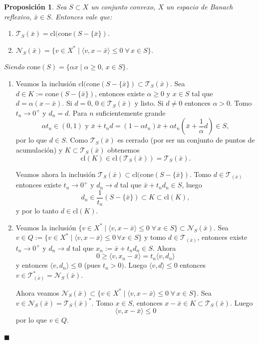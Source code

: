\documentclass[a4paper,10pt]{book}
\newcommand{\bx}{\bar{x}}
\newcommand{\cN}{\mathcal{N}}
\newcommand{\cT}{\mathcal{T}}
\newcommand{\la}{\langle}
\newcommand{\ra}{\rangle}
\newtheorem{prop}[teo]{Proposici\'on}
\newenvironment{dem}{\vspace*{-0.1cm}{\it Demostraci\'on:}}{\hfill
$\blacksquare$\\}
\begin{document}
\begin{prop}\label{conoconv}
Sea $S\subset X$ un conjunto convexo, $X$ un espacio de Banach reflexivo, $\bx\in S$. Entonces vale que:
\begin{enumerate}
\item $\cT_{S}(\bx)=\mathrm{cl}(\mathrm{cone}(S-\{\bx\})$.
\item $\cN_{S}(\bx)=\{v\in X^*\mid\langle v,x-\bx\rangle\leq 0\; \forall\,x\in S\}$.
\end{enumerate}
Siendo $\mathrm{cone}(S)=\{\alpha x\mid \alpha\geq0,\,x\in S\}$.
\end{prop} 
\begin{dem}
\begin{enumerate}
\item Veamos la inclusión $\mathrm{cl}(\mathrm{cone}(S-\{\bx\})\subset\cT_{S}(\bx)$. Sea $d\in K:=\mathrm{cone}(S-\{\bx\})$, entonces existe $\alpha\geq0$ y $x\in S$ tal que $d=\alpha(x-\bx)$. Si $d=0,\, 0\in \cT_S(\bx)$ y listo.
Si $d\neq0$ entonces $\alpha>0$. Tomo $t_n\to0^+$ y $d_n=d$. Para $n$ suficientemente grande $$\alpha t_n\in (0,1)\mbox{ y }\bx+t_nd=(1-\alpha t_n)\bx+\alpha t_n(\bx+\frac{1}{\alpha}d)\in S,$$ por lo que $d\in S$. Como $\cT_S(\bx)$ es cerrado (por ser un conjunto de puntos de acumulación) y $K\subset\cT_S(\bx)$ obtenemos $$\mathrm{cl}(K)\in\mathrm{cl}(\cT_S(\bx))=\cT_S(\bx).$$

Veamos ahora la inclusión $\cT_{S}(\bx)\subset\mathrm{cl}(\mathrm{cone}(S-\{\bx\})$. Tomo $d\in\cT_(\bx)$ entonces existe $t_n\to0^+$ y $d_n\to d$ tal que $\bx+t_nd_n\in S$, luego $$d_n\in\frac{1}{t_n}(S-\{\bx\})\subset K\subset\mathrm{cl}(K),$$ y por lo tanto $d\in \mathrm{cl}(K)$.
\item Veamos la inclusión $\{v\in X^*\mid\langle v,x-\bx\rangle\leq 0\; \forall\,x\in S\}\subset\cN_{S}(\bx)$. Sea $v\in Q:=\{v\in X^*\mid \la v,x-\bx\ra\leq0\,\forall x\in S\}$ y tomo $d\in\cT_(\bx)$, entonces existe $t_n\to 0^+$ y $d_n\to d$ tal que $x_n:=\bx+t_nd_n\in S$. Ahora $$0\geq \la v , x_n-\bx\ra=t_n\la v,d_n\ra$$ y entonces $\la v ,d_n\ra\leq0$ (pues $t_n>0)$. Luego $\la v,d\ra\leq0$ entonces $v\in\cT_(\bx)^*=\cN_S(\bx)$.

Ahora veamos $\cN_{S}(\bx)\subset\{v\in X^*\mid\langle v,x-\bx\rangle\leq 0\;\forall\,x\in S\}$. Sea $v\in\cN_S(\bx)=\cT_S(\bx)^*$. Tomo $x\in S$, entonces $x-\bx\in K\subset\cT_S(\bx)$. Luego $$\la v ,x-\bx\ra\leq0$$ por lo que $v\in Q$.
\end{enumerate}
\end{dem}
\end{document}
